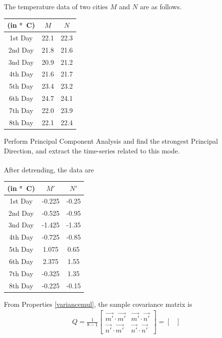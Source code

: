 \begin{exmp}
The temperature data of two cities $M$ and $N$ are as follows.
\begin{center}
\begin{tabular}{|c|c|c|}
\hline
(in \si{\degree C}) & $M$ & $N$\\
\hline
1st Day & 22.1 & 22.3 \\
\hline
2nd Day & 21.8 & 21.6 \\
\hline
3nd Day & 20.9 & 21.2 \\
\hline
4th Day & 21.6 & 21.7 \\
\hline
5th Day & 23.4 & 23.2 \\
\hline 
6th Day & 24.7 & 24.1 \\
\hline 
7th Day & 22.0 & 23.9 \\
\hline 
8th Day & 22.1 & 22.4 \\
\hline 
\end{tabular}
\end{center}
Perform Principal Component Analysis and find the strongest Principal Direction, and extract the time-series related to this mode.\\
\\
After detrending, the data are
\begin{center}
\begin{tabular}{|c|c|c|}
\hline
(in \si{\degree C}) & $M'$ & $N'$\\
\hline
1st Day & -0.225 & -0.25 \\
\hline
2nd Day & -0.525 & -0.95 \\
\hline
3nd Day & -1.425 & -1.35 \\
\hline
4th Day & -0.725 & -0.85 \\
\hline
5th Day & 1.075 & 0.65 \\
\hline 
6th Day & 2.375 & 1.55 \\
\hline 
7th Day & -0.325 & 1.35 \\
\hline 
8th Day & -0.225 & -0.15 \\
\hline 
\end{tabular}
\end{center}
From Properties \ref{variancemul}, the sample covariance matrix is
\begin{align*}
Q = 
\frac{1}{8-1}
\begin{bmatrix}
\vec{m'}\cdot\vec{m'} & \vec{m'}\cdot\vec{n'} \\
\vec{n'}\cdot\vec{m'} & \vec{n'}\cdot\vec{n'} 
\end{bmatrix} =
\begin{bmatrix}

\end{bmatrix}
\end{align*}
\end{exmp}
